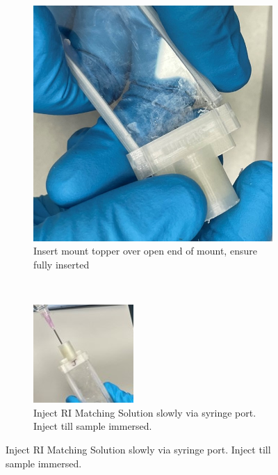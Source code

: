 \begin{figure}[H]
\begin{subfigure}{.4\linewidth}
  \includegraphics[width=\linewidth]{Images/Step9.jpg}
  \caption{Insert mount topper over open end of mount, ensure fully inserted}
  \label{velcomp}
\end{subfigure}\hfill 
~
\medskip
\begin{subfigure}{.4\linewidth}
  \includegraphics[width=\linewidth]{Images/Step10.jpg}
  \caption{Inject RI Matching Solution slowly via syringe port. Inject till sample immersed.}
  \label{estcomp}
\end{subfigure}\hfill 

\end{figure}

